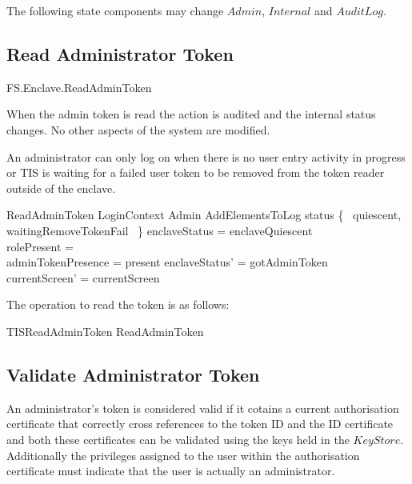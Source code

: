 \begin{Zcomment}
\item
The following state components may change
$Admin$, $Internal$ and $AuditLog$. 
\end{Zcomment}

\subsection{Read Administrator Token}

\begin{traceunit}{FS.Enclave.ReadAdminToken}
\end{traceunit}

When the admin token is read the action is audited and the internal
status changes. No other aspects of the system are modified.

An administrator can only log on when there is no user entry activity
in progress or TIS is waiting for a failed user token to be removed
from the token reader outside of the enclave.

\begin{schema}{ReadAdminToken}
         LoginContext
\also
        \Xi Admin
\also
        AddElementsToLog
\where
        status \in \{~ quiescent, waitingRemoveTokenFail ~\}
\also
        enclaveStatus = enclaveQuiescent
\\      rolePresent = \Nil
\\	adminTokenPresence = present
\also
	enclaveStatus' = gotAdminToken
\\      currentScreen' = currentScreen
\end{schema}

The operation to read the token is as follows:

\begin{zed}
        TISReadAdminToken  
                ReadAdminToken   
\end{zed}

\subsection{Validate Administrator Token}

An administrator's token is considered valid if it cotains a current
authorisation certificate that correctly cross references to the token
ID and the ID certificate and both these certificates can be validated
using the keys held in the $KeyStore$. Additionally the
privileges assigned to the user within the authorisation certificate
must indicate that the user is actually an administrator.

